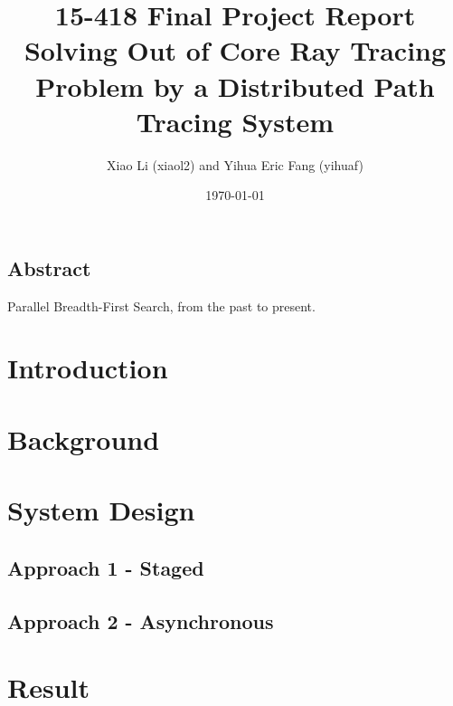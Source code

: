 \documentclass[a4paper, oneside, 10pt]{article}
\title{{\bf 15-418 Final Project Report \\
 \large Solving Out of Core Ray Tracing Problem by a Distributed Path Tracing System}} %
\author{Xiao Li (xiaol2) and Yihua Eric Fang (yihuaf)}
\date{\today} %
\begin{document}
\maketitle
\thispagestyle{empty}
\newpage
\begin{center}
\vspace*{\fill}
\section*{Abstract}
Parallel Breadth-First Search, from the past to present.\\
\vspace*{\fill}
\newpage
\end{center}

\tableofcontents
\newpage

\section{Introduction}
\section{Background}
\section{System Design}
\subsection{Approach 1 - Staged}
\subsection{Approach 2 - Asynchronous}
\section{Result}





\end{document}

